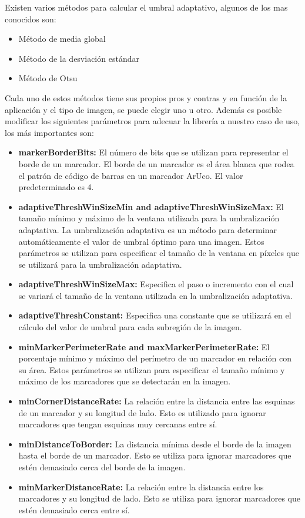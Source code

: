 Existen varios métodos para calcular el umbral adaptativo, algunos de los mas conocidos son:
\begin{itemize}
\item Método de media global
\item Método de la desviación estándar
\item Método de Otsu
\end{itemize}
Cada uno de estos métodos tiene sus propios pros y contras y en función de la aplicación y el tipo de imagen, se puede elegir uno u otro.
Además es posible modificar los siguientes parámetros para adecuar la librería a nuestro caso de uso, los más importantes son:
\begin{itemize}
    \item   \textbf{markerBorderBits:}
    El número de bits que se utilizan para representar el borde de un marcador. El borde de un marcador es el área blanca que rodea el patrón de código de barras en un marcador ArUco. El valor predeterminado es 4.
    \item \textbf{adaptiveThreshWinSizeMin and adaptiveThreshWinSizeMax:}
    El tamaño mínimo y máximo de la ventana utilizada para la umbralización adaptativa. La umbralización adaptativa es un método para determinar automáticamente el valor de umbral óptimo para una imagen. Estos parámetros se utilizan para especificar el tamaño de la ventana en píxeles que se utilizará para la umbralización adaptativa.
    \item \textbf{adaptiveThreshWinSizeMax:}
    Especifica el paso o incremento con el cual se variará el tamaño de la ventana utilizada en la umbralización adaptativa.
    \item \textbf{adaptiveThreshConstant:}
    Especifica una constante que se utilizará en el cálculo del valor de umbral para cada subregión de la imagen.
    \item \textbf{minMarkerPerimeterRate and maxMarkerPerimeterRate:}
    El porcentaje mínimo y máximo del perímetro de un marcador en relación con su área. Estos parámetros se utilizan para especificar el tamaño mínimo y máximo de los marcadores que se detectarán en la imagen.
    \item \textbf{minCornerDistanceRate:}
    La relación entre la distancia entre las esquinas de un marcador y su longitud de lado. Esto es utilizado para ignorar marcadores que tengan esquinas muy cercanas entre sí.
    \item \textbf{minDistanceToBorder:}
    La distancia mínima desde el borde de la imagen hasta el borde de un marcador. Esto se utiliza para ignorar marcadores que estén demasiado cerca del borde de la imagen.
    \item \textbf{ minMarkerDistanceRate:}
    La relación entre la distancia entre los marcadores y su longitud de lado. Esto se utiliza para ignorar marcadores que estén demasiado cerca entre sí.
\end{itemize}

